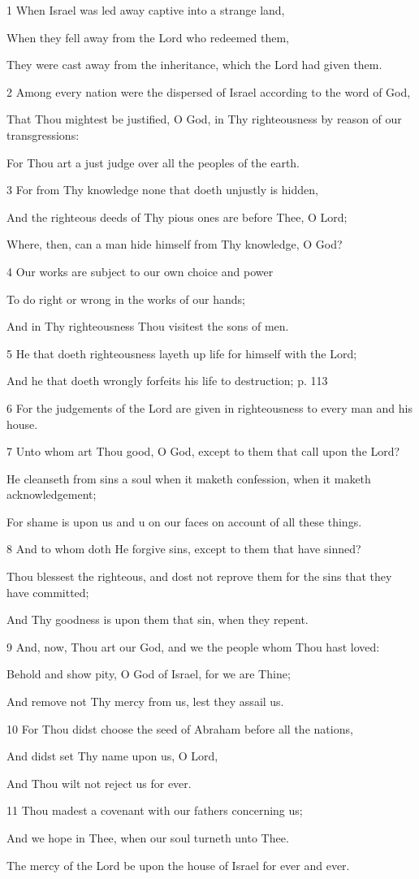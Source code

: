 \par 1 When Israel was led away captive into a strange land,
\par  When they fell away from the Lord who redeemed them,
\par  They were cast away from the inheritance, which the Lord had given them.
\par 2 Among every nation were the dispersed of Israel according to the word of God,
\par  That Thou mightest be justified, O God, in Thy righteousness by reason of our transgressions:
\par  For Thou art a just judge over all the peoples of the earth.
\par 3 For from Thy knowledge none that doeth unjustly is hidden,
\par  And the righteous deeds of Thy pious ones are before Thee, O Lord;
\par  Where, then, can a man hide himself from Thy knowledge, O God?
\par 4 Our works are subject to our own choice and power
\par  To do right or wrong in the works of our hands;
\par  And in Thy righteousness Thou visitest the sons of men.
\par 5 He that doeth righteousness layeth up life for himself with the Lord;
\par  And he that doeth wrongly forfeits his life to destruction; p. 113
\par 6 For the judgements of the Lord are given in righteousness to every man and his house.
\par 7 Unto whom art Thou good, O God, except to them that call upon the Lord?
\par  He cleanseth from sins a soul when it maketh confession, when it maketh acknowledgement;
\par  For shame is upon us and u on our faces on account of all these things.
\par 8 And to whom doth He forgive sins, except to them that have sinned?
\par  Thou blessest the righteous, and dost not reprove them for the sins that they have committed;
\par  And Thy goodness is upon them that sin, when they repent.
\par 9 And, now, Thou art our God, and we the people whom Thou hast loved:
\par  Behold and show pity, O God of Israel, for we are Thine;
\par  And remove not Thy mercy from us, lest they assail us.
\par 10 For Thou didst choose the seed of Abraham before all the nations,
\par  And didst set Thy name upon us, O Lord,
\par  And Thou wilt not reject us for ever.
\par 11 Thou madest a covenant with our fathers concerning us;
\par  And we hope in Thee, when our soul turneth unto Thee.
\par  The mercy of the Lord be upon the house of Israel for ever and ever.

